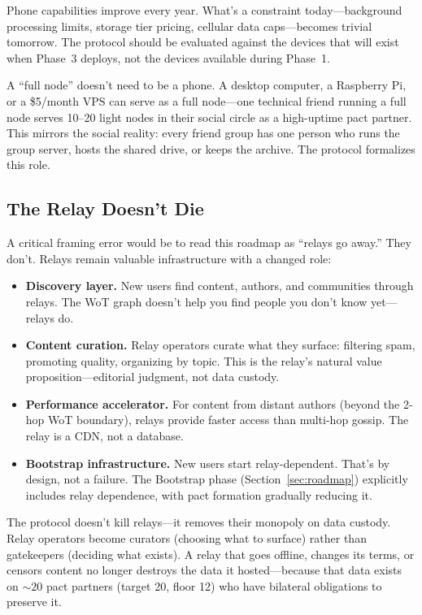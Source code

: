 \documentclass[11pt,a4paper]{article}
\begin{document}
Phone capabilities improve every year. What's a constraint today---background processing limits, storage tier pricing, cellular data caps---becomes trivial tomorrow. The protocol should be evaluated against the devices that will exist when Phase~3 deploys, not the devices available during Phase~1.

A ``full node'' doesn't need to be a phone. A desktop computer, a Raspberry Pi, or a \$5/month VPS can serve as a full node---one technical friend running a full node serves 10--20 light nodes in their social circle as a high-uptime pact partner. This mirrors the social reality: every friend group has one person who runs the group server, hosts the shared drive, or keeps the archive. The protocol formalizes this role.

\subsection{The Relay Doesn't Die}

A critical framing error would be to read this roadmap as ``relays go away.'' They don't. Relays remain valuable infrastructure with a changed role:

\begin{itemize}
  \item \textbf{Discovery layer.} New users find content, authors, and communities through relays. The WoT graph doesn't help you find people you don't know yet---relays do.
  \item \textbf{Content curation.} Relay operators curate what they surface: filtering spam, promoting quality, organizing by topic. This is the relay's natural value proposition---editorial judgment, not data custody.
  \item \textbf{Performance accelerator.} For content from distant authors (beyond the 2-hop WoT boundary), relays provide faster access than multi-hop gossip. The relay is a CDN, not a database.
  \item \textbf{Bootstrap infrastructure.} New users start relay-dependent. That's by design, not a failure. The Bootstrap phase (Section~\ref{sec:roadmap}) explicitly includes relay dependence, with pact formation gradually reducing it.
\end{itemize}

The protocol doesn't kill relays---it removes their monopoly on data custody. Relay operators become curators (choosing what to surface) rather than gatekeepers (deciding what exists). A relay that goes offline, changes its terms, or censors content no longer destroys the data it hosted---because that data exists on ${\sim}20$ pact partners (target 20, floor 12) who have bilateral obligations to preserve it.
\end{document}

